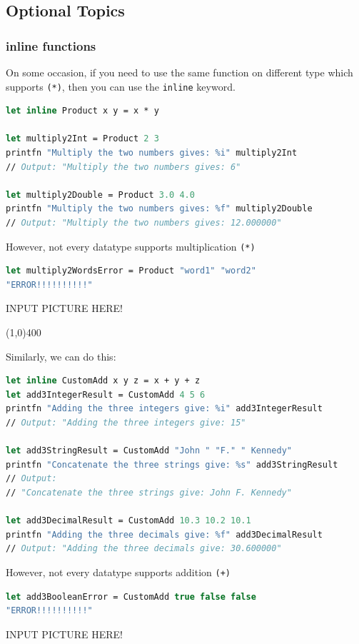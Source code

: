 \documentclass[12pt]{article}
\begin{document}
\subsection{Optional Topics}
\subsubsection{inline functions}
On some occasion, if you need to use the same function on different type which supports \texttt{(*)}, then you can use the \texttt{inline} keyword.
\begin{lstlisting}[language=FSharp]
let inline Product x y = x * y

let multiply2Int = Product 2 3
printfn "Multiply the two numbers gives: %i" multiply2Int
// Output: "Multiply the two numbers gives: 6"

let multiply2Double = Product 3.0 4.0
printfn "Multiply the two numbers gives: %f" multiply2Double
// Output: "Multiply the two numbers gives: 12.000000"
\end{lstlisting}
However, not every datatype supports multiplication \texttt{(*)}

\begin{lstlisting}[language=FSharp]
let multiply2WordsError = Product "word1" "word2"
"ERROR!!!!!!!!!!"
\end{lstlisting}
\begin{center}
INPUT PICTURE HERE!
\end{center}
\begin{center}
\line(1,0){400}
\end{center}
Similarly, we can do this:
\begin{lstlisting}[language=FSharp]
let inline CustomAdd x y z = x + y + z
let add3IntegerResult = CustomAdd 4 5 6
printfn "Adding the three integers give: %i" add3IntegerResult
// Output: "Adding the three integers give: 15"

let add3StringResult = CustomAdd "John " "F." " Kennedy"
printfn "Concatenate the three strings give: %s" add3StringResult
// Output:
// "Concatenate the three strings give: John F. Kennedy"

let add3DecimalResult = CustomAdd 10.3 10.2 10.1
printfn "Adding the three decimals give: %f" add3DecimalResult
// Output: "Adding the three decimals give: 30.600000"
\end{lstlisting}
However, not every datatype supports addition \texttt{(+)}
\begin{lstlisting}[language=FSharp]
let add3BooleanError = CustomAdd true false false
"ERROR!!!!!!!!!!"
\end{lstlisting}
\begin{center}
INPUT PICTURE HERE!
\end{center}
\end{document}
